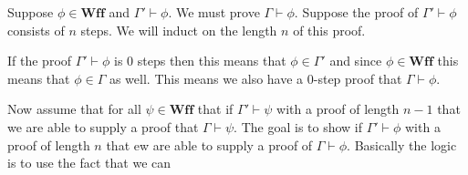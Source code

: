 \documentclass[12pt]{article}
\newcommand{\mc}[1]{\mathcal{#1}}
\begin{document}
Suppose $\phi \in \textbf{Wff}$ and $\Gamma' \vdash \phi$. We must prove $\Gamma \vdash \phi$. Suppose the proof of $\Gamma' \vdash \phi$ consists of $n$ steps. We will induct on the length $n$ of this proof. 

If the proof $\Gamma' \vdash \phi$ is $0$ steps then this means that $\phi \in \Gamma'$ and since $\phi \in \textbf{Wff}$ this means that $\phi \in \Gamma$ as well. This means we also have a 0-step proof that $\Gamma \vdash \phi$.

Now assume that for all $\psi \in \textbf{Wff}$ that if $\Gamma' \vdash \psi$ with a proof of length $n-1$ that we are able to supply a proof that $\Gamma \vdash \psi$. The goal is to show  if $\Gamma' \vdash \phi$ with a proof of length $n$ that ew are able to supply a proof of $\Gamma \vdash \phi$. Basically the logic is to use the fact that we can 



\end{document}
